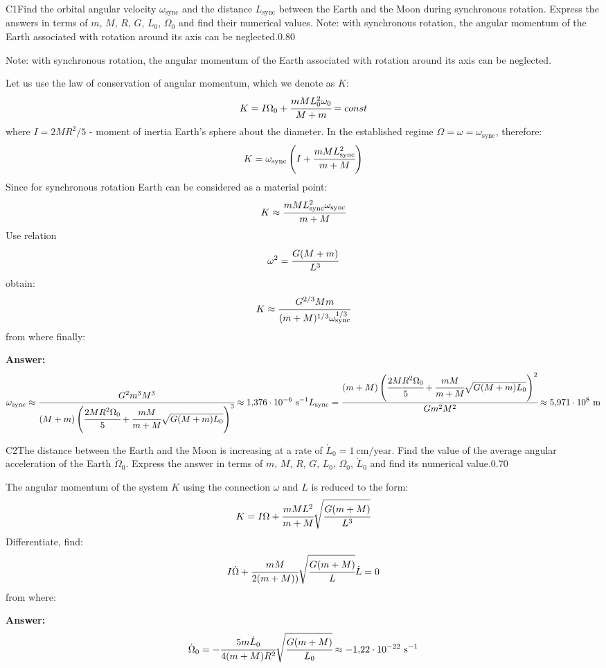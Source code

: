 \documentclass[11pt,a4paper]{article}
\begin{document}
\begin{solcard}{C1}{Find the orbital angular velocity $\omega_\text{sync}$ and the distance $L_\text{sync}$ between the Earth and the Moon during synchronous rotation. Express the answers in terms of $m$, $M$, $R$, $G$, $L_0$, $\Omega_0$ and find their numerical values. Note: with synchronous rotation, the angular momentum of the Earth associated with rotation around its axis can be neglected.}{0.80}

Note: with synchronous rotation, the angular momentum of the Earth associated with rotation around its axis can be neglected.


Let us use the law of conservation of angular momentum, which we denote as $K$: $$K=I\Omega_0+\cfrac{mML^2_0\omega_0}{M+m}=const $$ where $I=2MR^2/5$ - moment of inertia Earth's sphere about the diameter. In the established regime $\Omega=\omega=\omega_\text{sync}$, therefore: $$K=\omega_\text{sync}\left(I+\cfrac{mML^2_\text{sync}}{m+M}\right) $$ Since for synchronous rotation Earth can be considered as a material point: $$K\approx{\cfrac{mML^2_\text{sync}\omega_\text{sync}}{m+M}} $$ Use relation $$\omega^2=\cfrac{G(M+m)}{L^3} $$ obtain: $$K\approx\cfrac{G^{2/3}Mm}{(m+M)^{1/3}\omega^{1/3}_\text{sync}} $$ from where finally:

\par\smallskip\noindent\textbf{Answer:} $$\omega_\text{sync}\approx\cfrac{G^2m^3M^3}{(M+m)\left(\cfrac{2MR^2\Omega_0}{5}+\cfrac{mM}{m+M}\sqrt{G(M+m)L_0}\right)^3}\approx{1{,}376\cdot{10^{-6}}~\text{s}^{-1}} L_\text{sync}=\cfrac{(m+M)\left(\cfrac{2MR^2\Omega_0}{5}+\cfrac{mM}{m+M}\sqrt{G(M+m)L_0}\right)^2}{Gm^2M^2}\approx 5{,}971\cdot{10^8}~\text{m} $$
\end{solcard}

\begin{solcard}{C2}{The distance between the Earth and the Moon is increasing at a rate of $\dot{L}_{0}=1~\text{cm}/\text{year}$. Find the value of the average angular acceleration of the Earth $\dot{\Omega}_0$. Express the answer in terms of $m$, $M$, $R$, $G$, $L_0$, $\Omega_0$, $\dot{L}_0$ and find its numerical value.}{0.70}

The angular momentum of the system $K$ using the connection $\omega$ and $L$ is reduced to the form: $$K=I\Omega+\cfrac{mML^2}{m+M}\sqrt{\cfrac{G(m+M)}{L^3}} $$ Differentiate, find: $$I\dot{\Omega}+\cfrac{mM}{2(m+M))}\sqrt{\cfrac{G(m+M)}{L}}\dot{L}=0 $$ from where:

\par\smallskip\noindent\textbf{Answer:} $$\dot{\Omega}_0=-\cfrac{5m\dot{L}_0}{4(m+M)R^2}\sqrt{\cfrac{G(m+M)}{L_0}}\approx-1{,}22\cdot{10^{-22}}~\text{s}^{-1} $$
\end{solcard}
\end{document}
